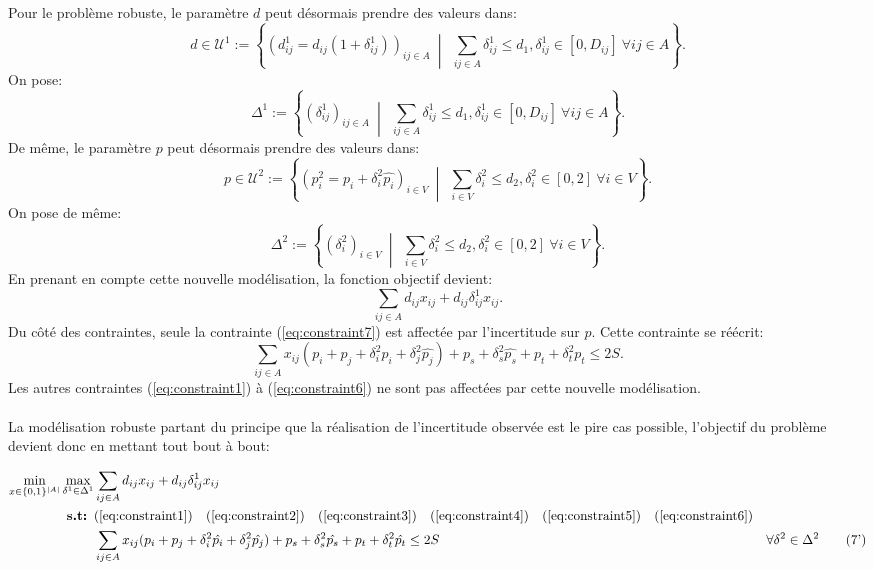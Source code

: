 \documentclass{article}
\begin{document}
Pour le problème robuste, le paramètre $d$ peut désormais prendre des valeurs dans:
\[
d \in \mathcal{U}^{1} := \left\{(d^{1}_{ij} = d_{ij}(1 + \delta^{1}_{ij}))_{ij \in A} \ \middle|\ \ \sum_{ij \in A} \delta^{1}_{ij} \leq d_1, \delta^{1}_{ij} \in [0, D_{ij}] \ \forall ij \in A\right\}.
\]
On pose:
\[
\Delta^{1} := \left\{(\delta^{1}_{ij})_{ij \in A} \ \middle|\ \ \sum_{ij \in A} \delta^{1}_{ij} \leq d_1, \delta^{1}_{ij} \in [0, D_{ij}] \ \forall ij \in A\right\}.
\]
De même, le paramètre $p$ peut désormais prendre des valeurs dans:
\[
p \in \mathcal{U}^{2} := \left\{(p^{2}_{i} = p_{i} + \delta^{2}_{i} \hat{p_i})_{i \in V} \ \middle|\ \ \sum_{i \in V} \delta^{2}_{i} \leq d_2, \delta^{2}_{i} \in [0, 2] \ \forall i \in V\right\}.
\]
On pose de même:
\[
\Delta^{2} := \left\{(\delta^{2}_{i})_{i \in V} \ \middle|\ \ \sum_{i \in V} \delta^{2}_{i} \leq d_2, \delta^{2}_{i} \in [0, 2] \ \forall i \in V\right\}.
\]
En prenant en compte cette nouvelle modélisation, la fonction objectif devient:
$$\sum_{ij \in A} d_{ij} x_{ij} + d_{ij} \delta_{ij}^{1} x_{ij}.$$
Du côté des contraintes, seule la contrainte (\ref{eq:constraint7}) est affectée par l'incertitude sur $p$. Cette contrainte se réécrit:
$$\sum_{ij \in A} x_{ij}(p_i + p_j + \delta_{i}^{2} \hat{p_i} + \delta_{j}^{2} \hat{p_j}) + p_s + \delta_{s}^{2} \hat{p_s} + p_t + \delta_{t}^{2} \hat{p_t} \leq 2S.$$
Les autres contraintes (\ref{eq:constraint1}) à (\ref{eq:constraint6}) ne sont pas affectées par cette nouvelle modélisation.
\\
\\
La modélisation robuste partant du principe que la réalisation de l'incertitude observée est le pire cas possible, l'objectif du problème devient donc en mettant tout bout à bout:

\begin{align}
  \min_{x \in \{0,1\}^{|A|}} \max_{\delta^{1} \in \Delta^{1}} & \sum_{ij \in A} d_{ij} x_{ij} + d_{ij} \delta_{ij}^{1} x_{ij} && \notag \\
  \textbf{s.t: }  & (\ref{eq:constraint1}) \quad (\ref{eq:constraint2}) \quad (\ref{eq:constraint3}) \quad (\ref{eq:constraint4}) \quad (\ref{eq:constraint5}) \quad (\ref{eq:constraint6}) \notag \\
  &\sum_{ij \in A} x_{ij}(p_i + p_j + \delta_{i}^{2} \hat{p_i} + \delta_{j}^{2} \hat{p_j}) + p_s + \delta_{s}^{2} \hat{p_s} + p_t + \delta_{t}^{2} \hat{p_t} \leq 2S & \forall \delta^{2} \in \Delta^{2} \tag{7'} \label{eq:constraint7prime}
\end{align}
\end{document}
